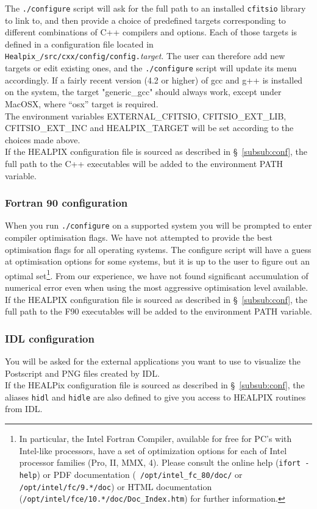 \documentclass[12pt,twoside]{article}
\begin{document}
The {\tt ./configure} script will 
ask for the full path to an installed {\tt cfitsio} library to link to, and then provide a choice of
predefined targets corresponding to different combinations of C++ compilers and
options. Each of those targets is defined in a configuration file located in
{\tt Healpix\_\hpxversion/src/cxx/config/config.}{\em target}.
The user can therefore add new targets or edit existing ones, and the
{\tt ./configure} script will update its menu accordingly.
If a fairly recent version
(4.2 or higher) of gcc and g++ is installed on the system, the target
"generic\_gcc" should always work, except under MacOSX, where ``osx'' target is
required.  \\
The environment variables EXTERNAL\_CFITSIO, 
CFITSIO\_EXT\_LIB, 
CFITSIO\_EXT\_INC and 
HEALPIX\_TARGET 
will be set according to the choices made above.
\\
If the HEALPIX configuration file is sourced as described in \S~\ref{subsub:conf}, the full path to the C++
executables will be added to the environment PATH variable.


\subsubsection{Fortran 90 configuration}
When you run {\tt ./configure} on a supported system 
you will be prompted to enter compiler optimisation flags.
We have not attempted to provide the best optimisation flags for all
operating systems. The configure
script will have a guess at optimisation options for some systems, but it
is up to the user to figure out an optimal set\footnote{In particular, the Intel Fortran
Compiler, available for free for PC's with Intel-like processors, have a set of
optimization options for each of Intel processor families (Pro, II, MMX, 4). Please consult
the online help ({\tt ifort -help}) or PDF documentation ({\tt
/opt/intel\_fc\_80/doc/} or {\tt /opt/intel/fc/9.*/doc}) or HTML documentation
({\tt /opt/intel/fce/10.*/doc/Doc\_Index.htm}) for further information.}. From our experience,
we have not found significant accumulation of numerical error even
when using the most aggressive optimisation level available. \\
If the HEALPIX configuration file is sourced as described in \S~\ref{subsub:conf}, the full path to the F90
executables will be added to the environment PATH variable.

\subsubsection{IDL configuration}
You will be asked for the external applications you want to use to visualize the
Postscript and PNG files created by IDL. \\
If the HEALPix configuration file is
sourced as described in \S~\ref{subsub:conf}, the aliases {\tt hidl} and {\tt hidle}
are also defined to give you access to HEALPIX routines from IDL.
\end{document}
